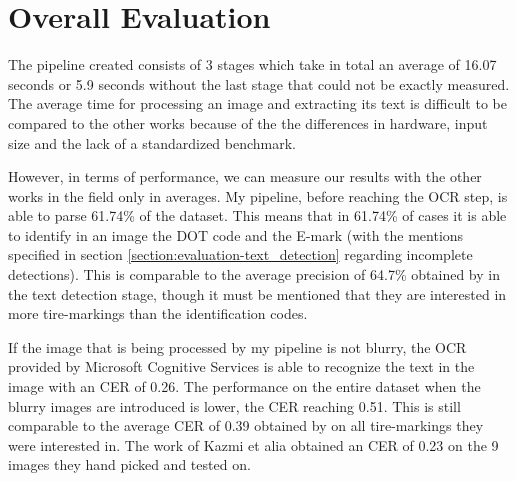 \section{Overall Evaluation}\label{section:evaluation-overall}

The pipeline created consists of 3 stages which take in total an average of 16.07 seconds or 5.9 seconds without the last stage that could not be exactly measured. The average time for processing an image and extracting its text is difficult to be compared to the other works \cite{article:1} \cite{site:0} because of the the differences in hardware, input size and the lack of a standardized benchmark.

However, in terms of performance, we can measure our results with the other works in the field only in averages. My pipeline, before reaching the OCR step, is able to parse 61.74\% of the dataset. This means that in 61.74\% of cases it is able to identify in an image the DOT code and the E-mark (with the mentions specified in section \ref{section:evaluation-text_detection} regarding incomplete detections). This is comparable to the average precision of 64.7\% obtained by \cite{site:0} in the text detection stage, though it must be mentioned that they are interested in more tire-markings than the identification codes.

If the image that is being processed by my pipeline is not blurry, the OCR provided by Microsoft Cognitive Services \cite{site:Microsoft_Cognitive_Services-Read_API-OCR} is able to recognize the text in the image with an CER of 0.26. The performance on the entire dataset when the blurry images are introduced is lower, the CER reaching 0.51. This is still comparable to the average CER of 0.39 obtained by \cite{site:0} on all tire-markings they were interested in. The work of Kazmi et alia \cite{article:1} obtained an CER of 0.23 on the 9 images they hand picked and tested on.
